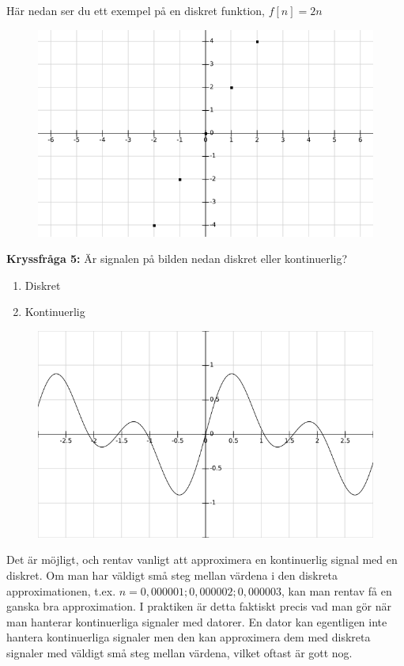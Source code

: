 \documentclass{article}
\begin{document}
Här nedan ser du ett exempel på en diskret funktion, $f[n]=2 n$
\begin{figure}[ht]
\centerline{\includegraphics[scale=0.55]{image10.png}}
\caption{}
\label{}
\end{figure}
\newpage

\textbf{Kryssfråga 5:} Är signalen på bilden nedan diskret eller kontinuerlig?
\begin{enumerate}[label={\alph*)},font={\bfseries}]
\item Diskret
\item Kontinuerlig
\end{enumerate}

\begin{figure}[ht]
\centerline{\includegraphics[scale=0.55]{image13.png}}
\caption{}
\label{}
\end{figure}

Det är möjligt, och rentav vanligt att approximera en kontinuerlig signal med en diskret. Om man har väldigt små steg mellan värdena i den diskreta approximationen, t.ex. $n={0,000001 ; 0,000002 ; 0,000003}$, kan man rentav få en ganska bra approximation. I praktiken är detta faktiskt precis vad man gör när man hanterar kontinuerliga signaler med datorer. En dator kan egentligen inte hantera kontinuerliga signaler men den kan approximera dem med diskreta signaler med väldigt små steg mellan värdena, vilket oftast är gott nog.
\end{document}
